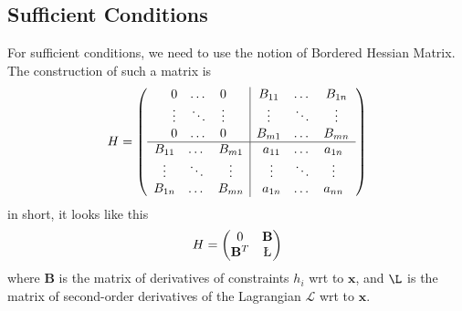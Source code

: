 \documentclass[11pt,a4paper]{book}
\theoremstyle{definition}\newtheorem{definition}{Definition}
\theoremstyle{definition}\newtheorem{fact}{Fact}
\theoremstyle{definition}\newtheorem{remark}{Remark}
\theoremstyle{definition}\newtheorem{ex}{Ex.}
\theoremstyle{definition}\newtheorem{project}{Project}
\theoremstyle{definition}\newtheorem{problem}{Problem}
\theoremstyle{definition}\newtheorem{example}{Example}
\numberwithin{theorem}{section}
\numberwithin{corollary}{chapter}
\numberwithin{assumption}{chapter}
\numberwithin{definition}{chapter}
\numberwithin{prop}{chapter}
\numberwithin{notation}{chapter}
\numberwithin{problem}{chapter}
\numberwithin{example}{chapter}
\numberwithin{fact}{chapter}
\numberwithin{ex}{chapter}
\def\B{\mathbf B}
\def\x{\mathbf x}
\begin{document}
	
	\subsection{Sufficient Conditions}
	For sufficient conditions, we need to use the notion of Bordered Hessian Matrix. The construction of such a matrix is
	\begin{equation*}
		H = \left( \begin{array}{c | c}
			\begin{matrix}
				0      & \dots  & 0      \\
				\vdots & \ddots & \vdots \\
				0      & \dots  & 0      
			\end{matrix} & 
			\begin{matrix}
				B_{11} & \dots  & B_{1n} \\
				\vdots & \ddots & \vdots \\
				B_{m1} & \dots  & B_{mn} 
			\end{matrix} \\
			\hline
			\begin{matrix}
				B_{11} & \dots  & B_{m1} \\
				\vdots & \ddots & \vdots \\
				B_{1n} & \dots  & B_{mn} 
			\end{matrix} & 
			\begin{matrix}
				a_{11} & \dots  & a_{1n} \\
				\vdots & \ddots & \vdots \\
				a_{1n} & \dots  & a_{nn} 
			\end{matrix}
		\end{array} \right)
	\end{equation*}
	in short, it looks like this
	\begin{align*}
		H = \begin{pmatrix}
			0 & \B \\ \B^T & \L
		\end{pmatrix}
	\end{align*}
	where $\B$ is the matrix of derivatives of constraints $h_i$ wrt to $\x$, and $\L$ is the matrix of second-order derivatives of the Lagrangian $\mathcal{L}$ wrt to $\x$. 
	
\end{document}
